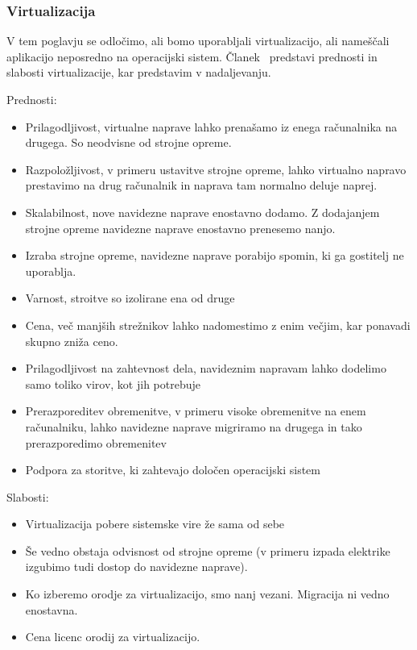 \subsubsection{Virtualizacija}

V tem poglavju se odločimo,
ali bomo uporabljali virtualizacijo,
ali nameščali aplikacijo neposredno na operacijski sistem.
Članek~\cite{virtualization_survey} predstavi prednosti in slabosti virtualizacije,
kar predstavim v nadaljevanju.

\bigskip

\noindent Prednosti:
\begin{itemize}
    \item Prilagodljivost, virtualne naprave lahko prenašamo 
    iz enega računalnika na drugega.
    So neodvisne od strojne opreme.

    \item Razpoložljivost, v primeru ustavitve strojne opreme,
    lahko virtualno napravo prestavimo na drug računalnik in
    naprava tam normalno deluje naprej.

    \item Skalabilnost, nove navidezne naprave enostavno dodamo.
    Z dodajanjem strojne opreme navidezne naprave enostavno prenesemo nanjo.

    \item Izraba strojne opreme, navidezne naprave porabijo spomin,
    ki ga gostitelj ne uporablja.

    \item Varnost, stroitve so izolirane ena od druge
    \item Cena, več manjših strežnikov lahko nadomestimo z enim večjim,
    kar ponavadi skupno zniža ceno.
    \item Prilagodljivost na zahtevnost dela, navideznim napravam 
    lahko dodelimo samo toliko virov, kot jih potrebuje
    \item Prerazporeditev obremenitve, v primeru visoke obremenitve na
    enem računalniku, lahko navidezne naprave migriramo na drugega in
    tako prerazporedimo obremenitev
    \item Podpora za storitve, ki zahtevajo določen operacijski sistem
\end{itemize}

\noindent Slabosti:
\begin{itemize}
    \item Virtualizacija pobere sistemske vire že sama od sebe
    \item Še vedno obstaja odvisnost od strojne opreme
    (v primeru izpada elektrike izgubimo tudi dostop do navidezne naprave).
    \item Ko izberemo orodje za virtualizacijo, smo nanj vezani.
    Migracija ni vedno enostavna.
    \item Cena licenc orodij za virtualizacijo.
\end{itemize}

